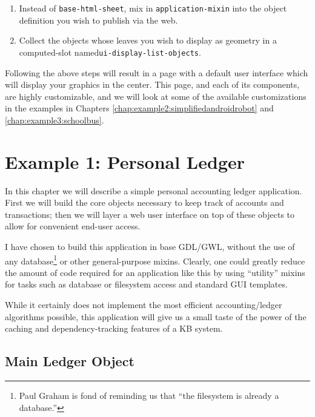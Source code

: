 \documentclass [11pt]{book}
\begin{document}
\begin{enumerate}

\item Instead of \texttt{base-html-sheet}, mix in \texttt{application-mixin} into the object definition you wish to publish via the web.

\item Collect the objects whose leaves you wish to display as geometry in a computed-slot named\texttt{ui-display-list-objects}.

\end{enumerate}

Following the above steps will result in a page with a default user interface which 
will display your graphics in the center. This page, and each of its components, are highly
customizable, and we will look at some of the available customizations in the examples in
Chapters 
\ref{chap:example2:simplifiedandroidrobot} and 
\ref{chap:example3:schoolbus}.

\chapter{Example 1: Personal Ledger}

\label{chap:example1:personalledger}

In this chapter we will describe a simple personal accounting ledger application. 
First we will build the core objects necessary to keep track of accounts and transactions; 
then we will layer a web user interface on top of these objects to allow for convenient
end-user access. 

I have chosen to build this application in base GDL/GWL, without the use of any database\footnote{Paul Graham is fond of reminding us that ``the filesystem is already a database.''} or other general-purpose mixins. Clearly, one could greatly reduce the amount of code
required for an application like this by using ``utility'' mixins for tasks such as database or
filesystem access and standard GUI templates. 

While it certainly does not implement the most efficient accounting/ledger algorithms possible, 
this application will give us a small taste of the power of the caching and dependency-tracking
features of a KB system.

\section{Main Ledger Object}
\end{document}
